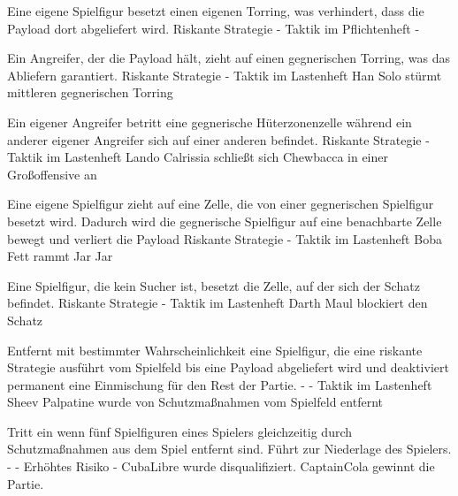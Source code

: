 {Eine eigene Spielfigur besetzt einen eigenen Torring, was verhindert, dass die Payload dort abgeliefert wird.}
{Riskante Strategie}
{-}
{Taktik}
{\glqqFlackern\grqq im Pflichtenheft}
{-}

{Ein Angreifer, der die Payload hält, zieht auf einen gegnerischen Torring, was das Abliefern garantiert.}
{Riskante Strategie}
{-}
{Taktik}
{\glqqNachtarocken\grqq im Lastenheft}
{Han Solo stürmt mittleren gegnerischen Torring}

{Ein eigener Angreifer betritt eine gegnerische Hüterzonenzelle während ein anderer eigener Angreifer sich auf einer anderen befindet.}
{Riskante Strategie}
{-}
{Taktik}
{\glqqStutschen\grqq im Lastenheft}
{Lando Calrissia schließt sich Chewbacca in einer Großoffensive an}

{Eine eigene Spielfigur zieht auf eine Zelle, die von einer gegnerischen Spielfigur besetzt wird. Dadurch wird die gegnerische Spielfigur auf eine benachbarte Zelle bewegt und verliert die Payload}
{Riskante Strategie}
{-}
{Taktik}
{\glqqKeilen\grqq im Lastenheft}
{Boba Fett rammt Jar Jar}

{Eine Spielfigur, die kein Sucher ist, besetzt die Zelle, auf der sich der Schatz befindet.}
{Riskante Strategie}
{-}
{Taktik}
{\glqqSchnatzeln\grqq im Lastenheft}
{Darth Maul blockiert den Schatz}

{Entfernt mit bestimmter Wahrscheinlichkeit eine Spielfigur, die eine riskante Strategie ausführt vom Spielfeld bis eine Payload abgeliefert wird und deaktiviert permanent eine Einmischung für den Rest der Partie.}
{-}
{-}
{Taktik}
{\glqqSchiedsrichter\grqq im Lastenheft}
{Sheev Palpatine wurde von Schutzmaßnahmen vom Spielfeld entfernt}

{Tritt ein wenn fünf Spielfiguren eines Spielers gleichzeitig durch Schutzmaßnahmen aus dem Spiel entfernt sind. Führt zur Niederlage des Spielers.}
{-}
{-}
{Erhöhtes Risiko}
{-}
{CubaLibre wurde disqualifiziert. CaptainCola gewinnt die Partie.}